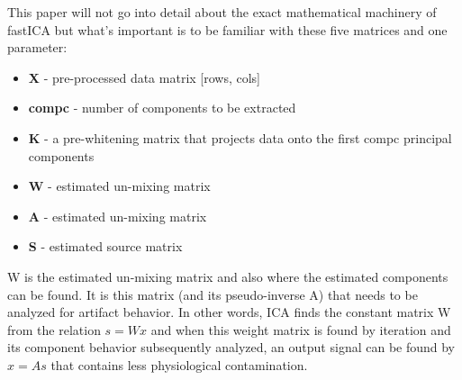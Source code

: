 This paper will not go into detail about the exact mathematical machinery of fastICA but what's important is to be familiar with these five matrices and one parameter:
\begin{itemize}
\item \textbf{X} - pre-processed data matrix [rows, cols]
\item \textbf{compc} - number of components to be extracted
\item \textbf{K} - a pre-whitening matrix that projects data onto the first compc principal components
\item \textbf{W} - estimated un-mixing matrix
\item \textbf{A} - estimated un-mixing matrix
\item \textbf{S} - estimated source matrix
\end{itemize}
W is the estimated un-mixing matrix and also where the estimated components can be found. It is this matrix (and its pseudo-inverse A) that needs to be analyzed for artifact behavior. In other words, ICA finds the constant matrix W from the relation $s=Wx$ and when this weight matrix is found by iteration and its component behavior subsequently analyzed, an output signal can be found by $x=As$ that contains less physiological contamination.




